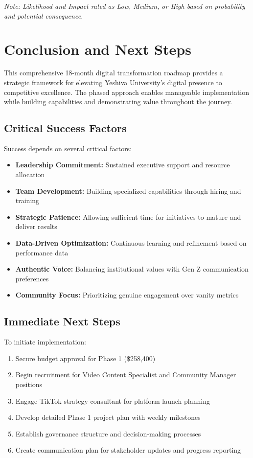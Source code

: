 \documentclass[12pt]{report}
\begin{document}
\textit{Note: Likelihood and Impact rated as Low, Medium, or High based on probability and potential consequence.}

\chapter{Conclusion and Next Steps}

This comprehensive 18-month digital transformation roadmap provides a strategic framework for elevating Yeshiva University's digital presence to competitive excellence. The phased approach enables manageable implementation while building capabilities and demonstrating value throughout the journey.

\section{Critical Success Factors}

Success depends on several critical factors:

\begin{itemize}
\item \textbf{Leadership Commitment:} Sustained executive support and resource allocation
\item \textbf{Team Development:} Building specialized capabilities through hiring and training
\item \textbf{Strategic Patience:} Allowing sufficient time for initiatives to mature and deliver results
\item \textbf{Data-Driven Optimization:} Continuous learning and refinement based on performance data
\item \textbf{Authentic Voice:} Balancing institutional values with Gen Z communication preferences
\item \textbf{Community Focus:} Prioritizing genuine engagement over vanity metrics
\end{itemize}

\section{Immediate Next Steps}

To initiate implementation:

\begin{enumerate}
\item Secure budget approval for Phase 1 (\$258,400)
\item Begin recruitment for Video Content Specialist and Community Manager positions
\item Engage TikTok strategy consultant for platform launch planning
\item Develop detailed Phase 1 project plan with weekly milestones
\item Establish governance structure and decision-making processes
\item Create communication plan for stakeholder updates and progress reporting
\end{enumerate}
\end{document}
